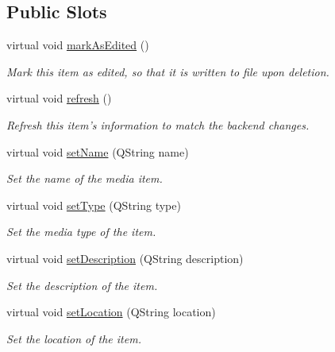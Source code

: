 \subsection*{Public Slots}
\begin{DoxyCompactItemize}
\item 
\hypertarget{class_a_w_e_1_1_media_item_a38cca15c5ea7dc342d5c702b424c9dde}{virtual void \hyperlink{class_a_w_e_1_1_media_item_a38cca15c5ea7dc342d5c702b424c9dde}{mark\-As\-Edited} ()}\label{class_a_w_e_1_1_media_item_a38cca15c5ea7dc342d5c702b424c9dde}

\begin{DoxyCompactList}\small\item\em Mark this item as edited, so that it is written to file upon deletion. \end{DoxyCompactList}\item 
virtual void \hyperlink{class_a_w_e_1_1_media_item_aa7c54847d45a04a252babbe51cf6cbfc}{refresh} ()
\begin{DoxyCompactList}\small\item\em Refresh this item's information to match the backend changes. \end{DoxyCompactList}\item 
virtual void \hyperlink{class_a_w_e_1_1_media_item_af5701c4e1e3c0caa808f63e1d9d959b2}{set\-Name} (Q\-String name)
\begin{DoxyCompactList}\small\item\em Set the name of the media item. \end{DoxyCompactList}\item 
virtual void \hyperlink{class_a_w_e_1_1_media_item_a6cdfff49d8b7af56a76b0260d306ed77}{set\-Type} (Q\-String type)
\begin{DoxyCompactList}\small\item\em Set the media type of the item. \end{DoxyCompactList}\item 
virtual void \hyperlink{class_a_w_e_1_1_media_item_ac6a5379f7151eafe4f77797d5c2244c2}{set\-Description} (Q\-String description)
\begin{DoxyCompactList}\small\item\em Set the description of the item. \end{DoxyCompactList}\item 
virtual void \hyperlink{class_a_w_e_1_1_media_item_a56876d9763c7779a5741a35b93945388}{set\-Location} (Q\-String location)
\begin{DoxyCompactList}\small\item\em Set the location of the item. \end{DoxyCompactList}\item 

\end{DoxyCompactItemize}
